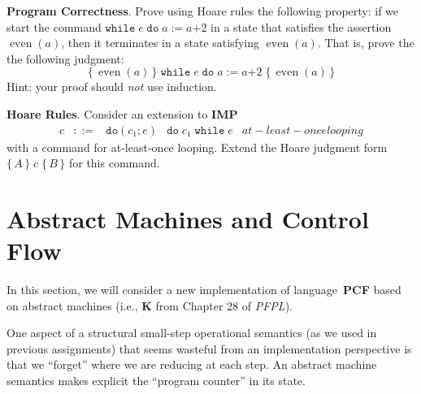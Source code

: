 \documentclass[12pt]{exam}
\newcommand{\fmtkw}[1]{\mathtt{#1}}
\newcommand{\expr}{\ensuremath{\mathit{e}}}
\newcommand{\addr}{\ensuremath{\mathit{a}}}
\newcommand{\plusc}[2]{\ensuremath{#1 \mathbin{\fmtkw{+}} #2}}
\newcommand{\cmd}{\ensuremath{\mathit{c}}}
\newcommand{\setc}[2]{\ensuremath{#1 \mathrel{\fmtkw{:=}} #2}}
\newcommand{\whilec}[2]{\ensuremath{\fmtkw{while}\;#1\;\fmtkw{do}\;#2}}
\newcommand{\dowhilea}[2]{\ensuremath{\fmtkw{do}(#1; #2)}}
\newcommand{\dowhilec}[2]{\ensuremath{\fmtkw{do}\;#1\;\fmtkw{while}\;#2}}
\newcommand{\assn}{\ensuremath{A}}
\newcommand{\IMP}{\textbf{\textsf{IMP}}\xspace}
\newcommand{\PCF}{\textbf{\textsf{PCF}}\xspace}
\newcommand{\K}{\textbf{\textsf{K}}\xspace}
\newcommand{\even}{\operatorname{even}}
\newcommand{\pcorrect}[3]{\ensuremath{\big\{\,#1\,\big\}\;#2\;\big\{\,#3\,\big\}}}
\begin{document}
\begin{questions}
\question \textbf{Program Correctness}.  Prove using Hoare rules the following property: if we start the command $\whilec{\expr}{\setc{\addr}{\plusc{\addr}{2}}}$ in a state that satisfies the assertion $\even(\addr)$, then it terminates in a state satisfying $\even(\addr)$. That is, prove the the following judgment:
\[
\pcorrect{ \even(\addr) }{ \whilec{\expr}{\setc{\addr}{\plusc{\addr}{2}}} }{ \even(\addr) }
\]
Hint: your proof should \emph{not} use induction.

\question \textbf{Hoare Rules}. Consider an extension to \IMP
\[\begin{array}{rcllL}
  \cmd & ::= & \dowhilea{\cmd_1}{\expr} & \dowhilec{\cmd_1}{\expr} & at-least-once looping
\end{array}\]
with a command for at-least-once looping. Extend the Hoare judgment form
\(
  \pcorrect{\assn}{\cmd}{B}
\)
for this command.
\end{questions}

\section{Abstract Machines and Control Flow}

In this section, we will consider a new implementation of language~\PCF based on abstract machines (i.e., \K from Chapter 28 of \emph{PFPL}).

One aspect of a structural small-step operational semantics (as we used in previous assignments) that seems wasteful from an implementation perspective is that we ``forget'' where we are reducing at each step. An abstract machine semantics makes explicit the ``program counter'' in its state.
\end{document}

